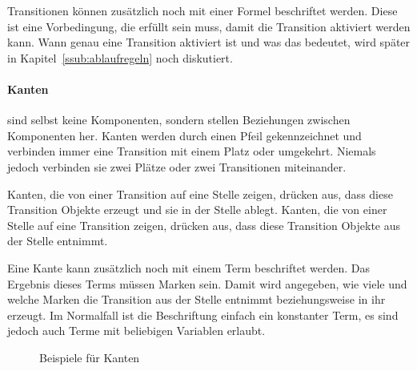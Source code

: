 	Transitionen können zusätzlich noch mit einer Formel beschriftet werden. Diese ist eine Vorbedingung, die erfüllt sein muss, damit die Transition aktiviert werden kann. Wann genau eine Transition aktiviert ist und was das bedeutet, wird später in Kapitel~\ref{ssub:ablaufregeln} noch diskutiert.

	\paragraph{Kanten} sind selbst keine Komponenten, sondern stellen Beziehungen zwischen Komponenten her. Kanten werden durch einen Pfeil gekennzeichnet und verbinden immer eine Transition mit einem Platz oder umgekehrt. Niemals jedoch verbinden sie zwei Plätze oder zwei Transitionen miteinander.

	Kanten, die von einer Transition auf eine Stelle zeigen, drücken aus, dass diese Transition Objekte erzeugt und sie in der Stelle ablegt. Kanten, die von einer Stelle auf eine Transition zeigen, drücken aus, dass diese Transition Objekte aus der Stelle entnimmt.

	Eine Kante kann zusätzlich noch mit einem Term beschriftet werden. Das Ergebnis dieses Terms müssen Marken sein. Damit wird angegeben, wie viele und welche Marken die Transition aus der Stelle entnimmt beziehungsweise in ihr erzeugt. Im Normalfall ist die Beschriftung einfach ein konstanter Term, es sind jedoch auch Terme mit beliebigen Variablen erlaubt.

	\begin{figure}[ht]
		\centering
		\caption{Beispiele für Kanten}
		\label{fig:kanten}
	\end{figure}

